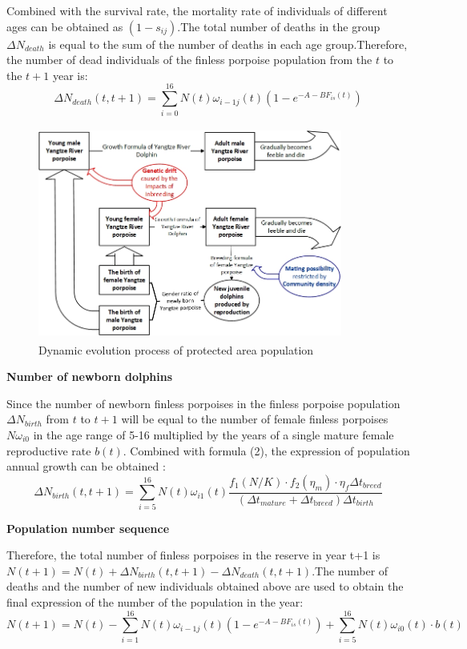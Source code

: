 \documentclass[12pt]{article}  %
\begin{document}
Combined with the survival rate, the mortality rate of individuals of different ages can be obtained as $(1-{{s}_{ij}})$.The total number of deaths in the group $\Delta {{N}_{death}}$ is equal to the sum of the number of deaths in each age group.Therefore, the number of dead individuals of the finless porpoise population from the $t$ to the $t+1$ year is:
\begin{equation}%
\Delta {{N}_{death}}(t,t+1)=\sum\limits_{i=0}^{16}{N(t){{\omega }_{i-1j}}(t)(1-{{e}^{-A-B{{F}_{is}}(t)}})}
\end{equation}
\begin{figure}[htbp]%
	\small
	\centering
	\includegraphics[height=7cm,width=10cm]{figures/VortexM1.jpg}%
	\caption{Dynamic evolution process of protected area population}%
\end{figure}
\noindent%
\Rightarrow  
\textbf{Number of newborn dolphins}

Since the number of newborn finless porpoises in the finless porpoise population $\Delta {{N}_{birth}}$ from $t$ to $t+1$ will be equal to the number of female finless porpoises $N{{\omega }_{i0}}$ in the age range of 5-16 multiplied by the years of a single mature female reproductive rate $b(t)$.
Combined with formula (2), the expression of population annual growth can be obtained :
\begin{equation}%
\Delta {{N}_{birth}}(t,t+1)=\sum\limits_{i=5}^{16}{N(t){{\omega }_{i1}}(t)\frac{{{f}_{1}}(N/K)\cdot {{f}_{2}}({{\eta }_{m}})\cdot {{\eta }_{f}}\Delta {{t}_{breed}}}{(\Delta {{t}_{mature}}+\Delta {{t}_{\text{br}eed}})\Delta {{t}_{birth}}}}
\end{equation}

\noindent%
\Rightarrow 
\textbf{Population number sequence}

Therefore, the total number of finless porpoises in the reserve in year t+1 is $N(t+1)=N(t)+\Delta {{N}_{birth}}(t,t+1)-\Delta {{N}_{death}}(t,t+1)$.The number of deaths and the number of new individuals obtained above are used to obtain the final expression of the number of the population in the year:
\begin{equation}%
N(t+1)=N(t)-\sum\limits_{i=1}^{16}{N(t){{\omega }_{i-1j}}(t)(1-{{e}^{-A-B{{F}_{is}}(t)}})}+\sum\limits_{i=5}^{16}{N(t){{\omega }_{i0}}(t)\cdot b(t)}
\end{equation}
\end{document}
